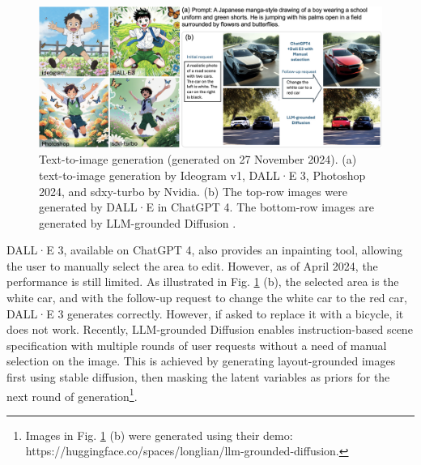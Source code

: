 \documentclass[11pt,a4paper]{article}
\begin{document}
\begin{figure}
    \centering
    \includegraphics[width=\textwidth]{figures/LLMGround.png}
    \caption{Text-to-image generation (generated on 27 November 2024). (a) text-to-image generation by Ideogram v1, DALL·E 3, Photoshop 2024, and sdxy-turbo by Nvidia. (b) The top-row images were generated by DALL·E in ChatGPT 4. The bottom-row images are generated by LLM-grounded Diffusion \cite{Lian:LLMG:2024}. }
    \label{fig:LLMGround}
\end{figure}


DALL·E 3, available on ChatGPT 4, also provides an inpainting tool, allowing the user to manually select the area to edit. However, as of April 2024, the performance is still limited. As illustrated in Fig. \ref{fig:LLMGround} (b), the selected area is the white car, and with the follow-up request to change the white car to the red car, DALL·E 3 generates correctly. However, if asked to replace it with a bicycle, it does not work. Recently, LLM-grounded Diffusion \cite{Lian:LLMG:2024} enables instruction-based scene specification with multiple rounds of user requests without a need of manual selection on the image. This is achieved by generating layout-grounded images first using stable diffusion, then masking the latent variables as priors for the next round of generation\footnote{Images in Fig. \ref{fig:LLMGround} (b) were generated using their demo: https://huggingface.co/spaces/longlian/llm-grounded-diffusion.}.  
\end{document}
